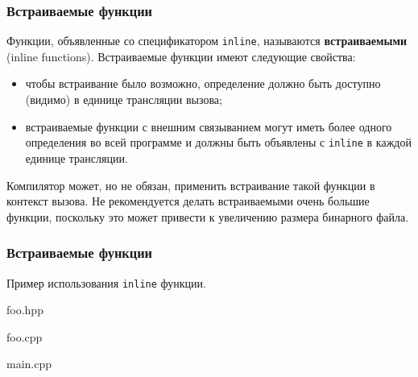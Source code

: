 \documentclass[compress, 8pt, aspectratio=169]{beamer}
\begin{document}
\begin{frame}[fragile]

    \frametitle{Встраиваемые функции}

    Функции, объявленные со спецификатором \verb|inline|\footnotemark{}, называются
    \textbf{встраиваемыми} (inline functions).
    Встраиваемые функции имеют следующие свойства:


    \begin{itemize}
        \item чтобы встраивание было возможно, определение должно быть доступно
            (видимо) в единице трансляции вызова;
        \item встраиваемые функции с внешним связыванием могут иметь более
            одного определения во всей программе и должны быть объявлены
            с \verb|inline| в каждой единице трансляции.
    \end{itemize}

    Компилятор может, но не обязан, применить встраивание\footnotemark{} такой
    функции в контекст вызова.
    Не рекомендуется делать встраиваемыми очень большие функции, поскольку это
    может привести к увеличению размера бинарного файла.


\end{frame}

\begin{frame}[fragile]

    \frametitle{Встраиваемые функции}

    Пример использования \verb|inline| функции.

        {foo.hpp}

        {foo.cpp}

        {main.cpp}

\end{frame}
\end{document}

